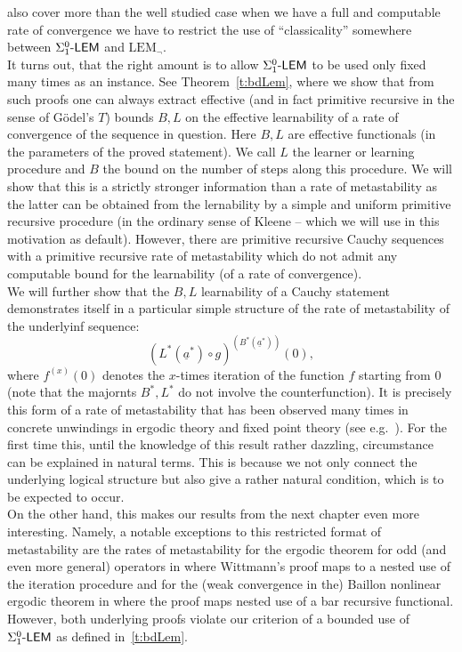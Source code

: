 also cover more than the well studied case when we have a full and computable
rate of convergence we have to restrict the use of ``classicality'' somewhere
between $\Sigma^0_1\textsf{\upshape -LEM}$ and $\mbox{LEM}_\neg$.  \\  
It turns out, that the right amount is to allow $\Sigma^0_1\textsf{\upshape -LEM}$ to be used
only fixed many times as an instance. See Theorem~\ref{t:bdLem}, where
we show that from such proofs one can always extract effective (and in 
fact primitive recursive in the sense of G\"odel's $T$) bounds $B,L$ on the 
effective learnability of a rate of convergence of the sequence in question.
 Here 
$B,L$ are effective functionals (in the parameters of the proved statement). We
call $L$ the learner or learning procedure and $B$ the bound on the number of 
steps along this procedure.  
We will show that this is a strictly stronger information than a 
rate of metastability as 
the latter can be obtained from the lernability
by a simple and uniform primitive 
recursive procedure (in the ordinary sense of Kleene -- which we will use in this motivation as default).
However, there are primitive recursive 
Cauchy sequences with a primitive recursive rate of metastability which 
do not admit any computable bound for the 
learnability (of a rate of convergence).\\ 
We will further show that the $B,L$ learnability of a Cauchy statement
demonstrates itself in a particular
simple structure of the rate of metastability of the underlyinf sequence:
\[ (L^*(\underline{a}^*)\circ g)^{(B^*(\underline{a}^*))}(0), \] 
where $f^{(x)}(0)$ denotes the $x$-times iteration of the function $f$ 
starting from $0$ (note that the majornts $B^*,L^*$ do not 
involve the counterfunction). It is precisely this form of a rate 
of metastability that has been observed many times in concrete unwindings 
in ergodic theory and fixed point theory (see e.g.~\cite{AGT10,kohlenbachleustean09,kohlenbachleustean10,Kohlenbach2011,Kohlenbach/Leustean6,Kohlenbach/Leustean7}). For the first time this, until the knowledge of this result rather dazzling, circumstance can be explained
in natural terms. This is because we not only connect the underlying logical structure but also give a rather natural condition,
which is to be expected to occur. \\
On the other hand, this makes our results from the next chapter even more interesting.
Namely, a notable exceptions to this restricted format of metastability are the rates 
of metastability for 
the ergodic theorem for odd (and even more general) operators in 
\cite{Safarik(11)} where Wittmann's proof maps to a nested use of the iteration procedure and 
for the (weak convergence in the) Baillon nonlinear ergodic theorem 
in \cite{Kohlenbach(Baillon)} where the proof maps nested use of a bar recursive 
functional. However, both underlying proofs violate our criterion of a bounded use of $\Sigma^0_1\textsf{\upshape -LEM}$
as defined in~\ref{t:bdLem}.\\

